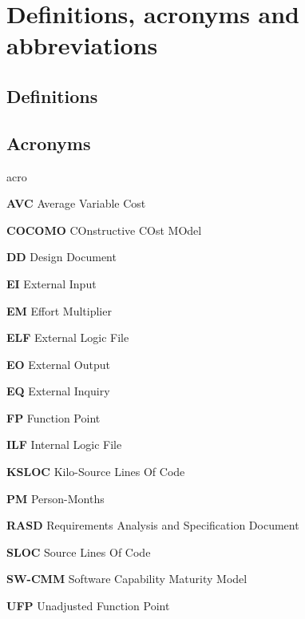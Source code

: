 \section{Definitions, acronyms and abbreviations}

\subsection{Definitions}

\subsection{Acronyms}
	\begin{labeling}{acro}
		\item[\textbf{AVC}] Average Variable Cost
		\item[\textbf{COCOMO}] COnstructive COst MOdel
		\item[\textbf{DD}] Design Document
		\item[\textbf{EI}] External Input
		\item[\textbf{EM}] Effort Multiplier
		\item[\textbf{ELF}] External Logic File
		\item[\textbf{EO}] External Output
		\item[\textbf{EQ}] External Inquiry
		\item[\textbf{FP}] Function Point
		\item[\textbf{ILF}] Internal Logic File
		\item[\textbf{KSLOC}] Kilo-Source Lines Of Code
		\item[\textbf{PM}] Person-Months
		\item[\textbf{RASD}] Requirements Analysis and Specification Document
		\item[\textbf{SLOC}] Source Lines Of Code
		\item[\textbf{SW-CMM}] Software Capability Maturity Model
		\item[\textbf{UFP}] Unadjusted Function Point
	\end{labeling}

